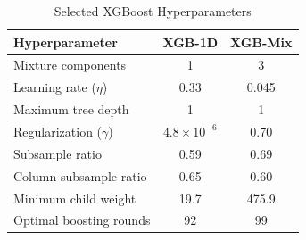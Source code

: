 \begin{table}[H]
\centering
\caption{Selected XGBoost Hyperparameters}
\label{tab:xgb_hparams}
\begin{tabular}{lcc}
\toprule
Hyperparameter & XGB-1D & XGB-Mix \\
\midrule
Mixture components & 1 & 3 \\
Learning rate ($\eta$) & 0.33 & 0.045 \\
Maximum tree depth & 1 & 1 \\
Regularization ($\gamma$) & $4.8 \times 10^{-6}$ & 0.70 \\
Subsample ratio & 0.59 & 0.69 \\
Column subsample ratio & 0.65 & 0.60 \\
Minimum child weight & 19.7 & 475.9 \\
Optimal boosting rounds & 92 & 99 \\
\bottomrule
\end{tabular}
\end{table}
